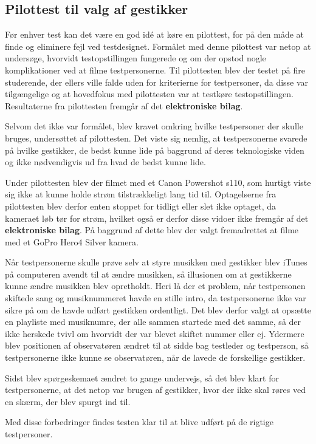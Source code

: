 \subsection{Pilottest til valg af gestikker}
\label{PilottestValgAfGestikker}
Før enhver test kan det være en god idé at køre en pilottest, for på den måde at finde og eliminere fejl ved testdesignet. Formålet med denne pilottest var netop at undersøge, hvorvidt testopstillingen fungerede og om der opstod nogle komplikationer ved at filme testpersonerne. Til pilottesten blev der testet på fire studerende, der ellers ville falde uden for kriterierne for testpersoner, da disse var tilgængelige og at hovedfokus med pilottesten var at testkøre testopstillingen. Resultaterne fra pilottesten fremgår af det \textbf{elektroniske bilag}. 

Selvom det ikke var formålet, blev kravet omkring hvilke testpersoner der skulle bruges, undersøttet af pilottesten. Det viste sig nemlig, at testpersonerne svarede på hvilke gestikker, de bedst kunne lide på baggrund af deres teknologiske viden og ikke nødvendigvis ud fra hvad de bedst kunne lide.  

Under pilottesten blev der filmet med et Canon Powershot s110, som hurtigt viste sig ikke at kunne holde strøm tilstrækkeligt lang tid til. Optagelserne fra pilottesten blev derfor enten stoppet for tidligt eller slet ikke optaget, da kameraet løb tør for strøm, hvilket også er derfor disse vidoer ikke fremgår af det \textbf{elektroniske bilag}. På baggrund af dette blev der valgt fremadrettet at filme med et GoPro Hero4 Silver kamera. 

Når testpersonerne skulle prøve selv at styre musikken med gestikker blev iTunes på computeren avendt til at ændre musikken, så illusionen om at gestikkerne kunne ændre musikken blev opretholdt. Heri lå der et problem, når testpersonen skiftede sang og musiknummeret havde en stille intro, da testpersonerne ikke var sikre på om de havde udført gestikken ordentligt. Det blev derfor valgt at opsætte en playliste med musiknumre, der alle sammen startede med det samme, så der ikke herskede tvivl om hvorvidt der var blevet skiftet nummer eller ej. Ydermere blev positionen af observatøren ændret til at sidde bag testleder og testperson, så testpersonerne ikke kunne se observatøren, når de lavede de forskellige gestikker. 

Sidst blev spørgeskemaet ændret to gange undervejs, så det blev klart for testpersonerne, at det netop var brugen af gestikker, hvor der ikke skal røres ved en skærm, der blev spurgt ind til. 

Med disse forbedringer findes testen klar til at blive udført på de rigtige testpersoner. 